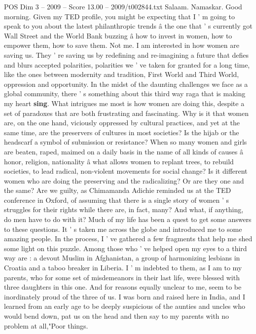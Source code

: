 \begin{textsample}{POS Dim 3 – 2009 – Score 13.00 – 2009/t002844.txt}  \label{ex:f3_pos_053}
Salaam.
Namaskar.
Good morning.
Given my TED profile, you might be expecting that I ' m going to speak to you about the latest philanthropic trends â the one that ' s currently got Wall Street and the World Bank buzzing â how to invest in women, how to empower them, how to save them.
Not me.
I am interested in how women are saving us.
They ' re saving us by redefining and re-imagining a future that defies and blurs accepted polarities, polarities we ' ve taken for granted for a long time, like the ones between modernity and tradition, First World and Third World, oppression and opportunity.
In the midst of the daunting challenges we face as a global community, there ' s something about this third way raga that is making my heart \textbf{sing}.
What intrigues me most is how women are doing this, despite a set of paradoxes that are both frustrating and fascinating.
Why is it that women are, on the one hand, viciously oppressed by cultural practices, and yet at the same time, are the preservers of cultures in most societies?
Is the hijab or the headscarf a symbol of submission or resistance?
When so many women and girls are beaten, raped, maimed on a daily basis in the name of all kinds of causes â honor, religion, nationality â what allows women to replant trees, to rebuild societies, to lead radical, non-violent movements for social change?
Is it different women who are doing the preserving and the radicalizing?
Or are they one and the same?
Are we guilty, as Chimamanda Adichie reminded us at the TED conference in Oxford, of assuming that there is a single story of women ' s struggles for their rights while there are, in fact, many?
And what, if anything, do men have to do with it?
Much of my life has been a quest to get some answers to these questions.
It ' s taken me across the globe and introduced me to some amazing people.
In the process, I ' ve gathered a few fragments that help me shed some light on this puzzle.
Among those who ' ve helped open my eyes to a third way are : a devout Muslim in Afghanistan, a group of harmonizing lesbians in Croatia and a taboo breaker in Liberia.
I ' m indebted to them, as I am to my parents, who for some set of misdemeanors in their last life, were blessed with three daughters in this one.
And for reasons equally unclear to me, seem to be inordinately proud of the three of us.
I was born and raised here in India, and I learned from an early age to be deeply suspicious of the aunties and uncles who would bend down, pat us on the head and then say to my parents with no problem at all,"Poor things.

\end{textsample}
